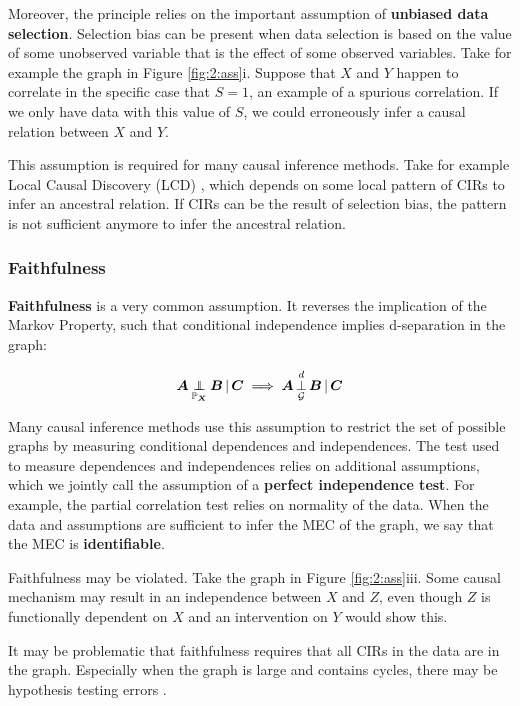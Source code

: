 Moreover, the principle relies on the important assumption of \textbf{unbiased data selection}. Selection bias can be present when data selection is based on the value of some unobserved variable that is the effect of some observed variables. Take for example the graph in Figure \ref{fig:2:ass}i. Suppose that $X$ and $Y$ happen to correlate in the specific case that $S=1$, an example of a spurious correlation. If we only have data with this value of $S$, we could erroneously infer a causal relation between $X$ and $Y$.

This assumption is required for many causal inference methods. Take for example Local Causal Discovery (LCD) \citep{cooper1997simple}, which depends on some local pattern of CIRs to infer an ancestral relation. If CIRs can be the result of selection bias, the pattern is not sufficient anymore to infer the ancestral relation.


\subsubsection{Faithfulness}

\textbf{Faithfulness} is a very common assumption. It reverses the implication of the Markov Property, such that conditional independence implies d-separation in the graph:

$$\indep{\B{A}}{\B{B}}{\B{C}}{\Prb_{\B{X}}} \implies \dsep{\B{A}}{\B{B}}{\B{C}}{\C{G}}$$

Many causal inference methods use this assumption to restrict the set of possible graphs by measuring conditional dependences and independences. The test used to measure dependences and independences relies on additional assumptions, which we jointly call the assumption of a \textbf{perfect independence test}. For example, the partial correlation test relies on normality of the data. When the data and assumptions are sufficient to infer the MEC of the graph, we say that the MEC is \textbf{identifiable}.

Faithfulness may be violated. Take the graph in Figure \ref{fig:2:ass}iii. Some causal mechanism may result in an independence between $X$ and $Z$, even though $Z$ is functionally dependent on $X$ and an intervention on $Y$ would show this.

It may be problematic that faithfulness requires that all CIRs in the data are in the graph. Especially when the graph is large and contains cycles, there may be hypothesis testing errors \citep{uhler2013geometry}.


